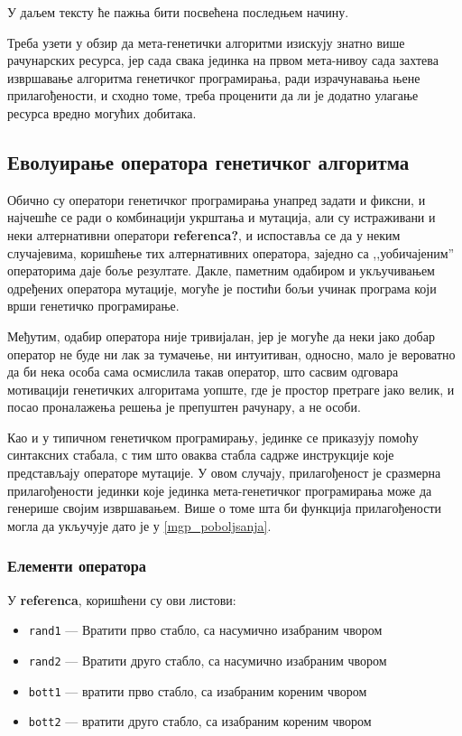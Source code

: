 \documentclass[a4paper]{article}
\begin{document}
У даљем тексту ће пажња бити посвећена последњем начину.
\newline

Треба узети у обзир да мета-генетички алгоритми изискују знатно више рачунарских ресурса, јер сада свака јединка на првом мета-нивоу сада захтева извршавање алгоритма генетичког програмирања, ради израчунавања њене прилагођености, и сходно томе, треба проценити да ли је додатно улагање ресурса вредно могућих добитака.

\subsection{Еволуирање оператора генетичког алгоритма}

Обично су оператори генетичког програмирања унапред задати и фиксни, и најчешће се ради о комбинацији укрштања и мутација, али су истраживани и неки алтернативни оператори \textbf{referenca?}, и испоставља се да у неким случајевима, коришћење тих алтернативних оператора, заједно са ,,уобичајеним'' операторима даје боље резултате. Дакле, паметним одабиром и укључивањем одређених оператора мутације, могуће је постићи бољи учинак програма који врши генетичко програмирање.
\newline

Међутим, одабир оператора није тривијалан, јер је могуће да неки јако добар оператор не буде ни лак за тумачење, ни интуитиван, односно, мало је вероватно да би нека особа сама осмислила такав оператор, што сасвим одговара мотивацији генетичких алгоритама уопште, где је простор претраге јако велик, и посао проналажења решења је препуштен рачунару, а не особи.
\newline

Као и у типичном генетичком програмирању, јединке се приказују помоћу синтаксних стабала, с тим што оваква стабла садрже инструкције које представљају операторе мутације. У овом случају, прилагођеност је сразмерна прилагођености јединки које јединка мета-генетичког програмирања може да генерише својим извршавањем. Више о томе шта би функција прилагођености могла да укључује дато је у \ref{mgp_poboljsanja}.
\newline

\subsubsection{Елементи оператора}
У \textbf{referenca}, коришћени су ови листови:
\begin{itemize}
\item \texttt{rand1} — Вратити прво стабло, са насумично изабраним чвором
\item \texttt{rand2} — Вратити друго стабло, са насумично изабраним чвором
\item \texttt{bott1} — вратити прво стабло, са изабраним кореним чвором
\item \texttt{bott2} — вратити друго стабло, са изабраним кореним чвором
\end{itemize}
\end{document}
